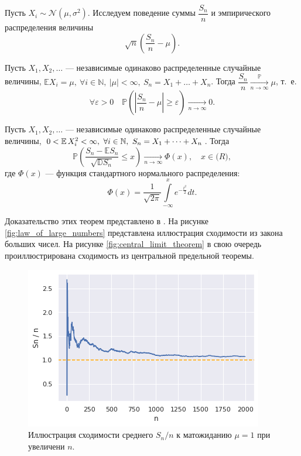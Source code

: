 Пусть $X_i\sim\mathcal{N}(\mu,\sigma^2)$. Исследуем поведение суммы $\dfrac{S_n}{n}$
 и эмпирического распределения величины
$$
 \sqrt{n}\left(\dfrac{S_n}{n}-\mu\right).
$$
\begin{theorem}
	Пусть $X_1,X_2,\ldots$ --- независимые одинаково распределенные случайные величины,
	 $\mathbb{E} X_i = \mu ,\ \forall i \in \mathbb{N},\ | \mu | < \infty ,\ S_n = X_1 +
	 \dots + X_n $.
	Тогда
	 $ \dfrac{S_n}{n} \xrightarrow[n \to \infty]{\mathbb{P}} {}\mu $, т.~е.
	$$
	 \forall \varepsilon > 0 \quad \mathbb{P} \left( \left| \dfrac{S_n}{n} - \mu \right|
	 \ge \varepsilon \right) \xrightarrow [n \to \infty] {}0.
	$$
\end{theorem}
\begin{theorem}
	Пусть $ X_1, X_2, \dots $ --- независимые одинаково распределенные случайные
	 величины, $ 0 < \operatorname{\mathbb{E}} X_i^2 < \infty,\ \forall i \in \mathbb{N},\ S_n = X_1 
	 + \dots + X_n $.
	Тогда
	$$
	 \mathbb{P} \left( \dfrac{S_n - \mathbb{E} S_n}{\sqrt{\mathbb{D} S_n}} \leq x \right) 
	 \xrightarrow [n \to \infty]{} \Phi(x), \quad x \in \mathbb(R),
	$$
	где $\Phi(x)$ --- функция стандартного нормального распределения:
	$$
	 \Phi(x) = \dfrac{1}{\sqrt{2\pi}} \int\limits_{-\infty}^x e^{-\frac{t^2}{2}} dt.
	$$
\end{theorem}
Доказательство этих теорем представлено в \cite{shir_prob}. На рисунке
 \eqref{fig:law_of_large_numbers} представлена иллюстрация сходимости из закона
 больших чисел. На рисунке \eqref{fig:central_limit_theorem} в свою очередь
 проиллюстрирована сходимость из центральной предельной теоремы. 
\begin{figure}[ht]
	\centering
	\includegraphics[width = 0.7\linewidth]{"./resources/law_of_large_numbers.png"}
	\caption{Иллюстрация сходимости среднего $ S_n / n $ к матожиданию $ \mu = 1 $ при
	 увеличени $ n $.}
    \label{fig:law_of_large_numbers}
\end{figure}

